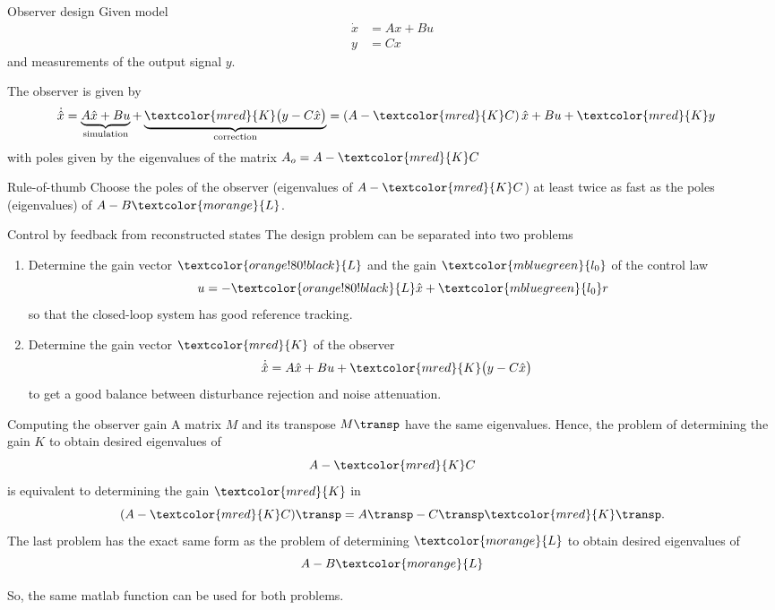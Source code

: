 \documentclass[presentation,aspectratio=169]{beamer}
\begin{document}
\begin{frame}[label={sec:org331a250}]{Observer design}
Given model
 \begin{equation*}
 \begin{split}
  \dot{x} &= A x + B u\\
  y &= C x
 \end{split}
 \label{eq:ssmodel}
\end{equation*}
and measurements of the output signal \(y\). 

The observer is given by
\begin{equation*}
\begin{split}
\dot{\hat{x}} &= \underbrace{A \hat{x} + B u{}}_{\text{simulation}} + \underbrace{\textcolor{mred}{K}\big(y - C\hat{x}\big)}_{\text{correction}} = \left(A - \textcolor{mred}{K}C\right)\hat{x} +  B u{} + \textcolor{mred}{K}y
\end{split}
\end{equation*}
with poles given by the eigenvalues of the matrix \(A_o = A - \textcolor{mred}{K}C\)

\alert{Rule-of-thumb} Choose the poles of the observer (eigenvalues of \(A-\textcolor{mred}{K}C\)) at least twice as fast as the poles (eigenvalues) of \(A-B \textcolor{morange}{L}\).
\end{frame}


\begin{frame}[label={sec:orge761c84}]{Control by feedback from reconstructed states}
The design problem can be separated into two problems
\begin{enumerate}
\item Determine the gain vector \(\textcolor{orange!80!black}{L}\) and the gain \(\textcolor{mbluegreen}{l_0}\) of the control law
\[ u{} = -\textcolor{orange!80!black}{L} \hat{x} + \textcolor{mbluegreen}{l_0} r\]
so that the closed-loop system has good reference tracking.
\item Determine the gain vector \(\textcolor{mred}{K}\) of the observer
\begin{equation*}
\begin{split}
\dot{\hat{x}} &= A \hat{x} + B u{} + \textcolor{mred}{K} \big(y - C\hat{x}\big)
\end{split}
\end{equation*}
to get a good balance between disturbance rejection and noise attenuation.
\end{enumerate}
\end{frame}

\begin{frame}[label={sec:org6159338}]{Computing the observer gain}
A matrix \(M\) and its transpose \(M\transp\) have the same eigenvalues. Hence, the problem of determining the gain \(K\) to obtain desired eigenvalues of 
\[A- \textcolor{mred}{K}C\] is equivalent to determining the gain \(\textcolor{mred}{K}\) in 
\[(A-\textcolor{mred}{K}C)\transp = A\transp - C\transp \textcolor{mred}{K}\transp.\]
The last problem has the exact same form as the problem of determining \(\textcolor{morange}{L}\) to obtain desired eigenvalues of 
\[A - B \textcolor{morange}{L}\]

So, the same matlab function can be used for both problems.
\end{frame}
\end{document}
